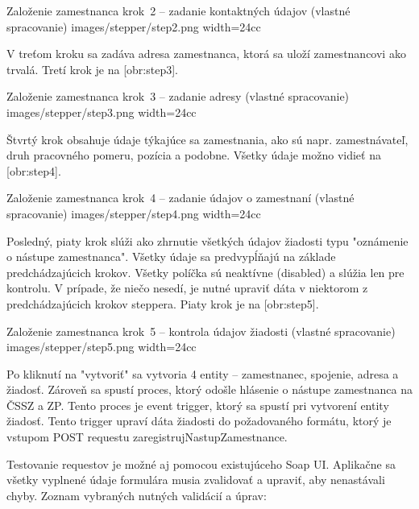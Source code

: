 {Založenie zamestnanca krok~2 -- zadanie kontaktných údajov (vlastné spracovanie)}
{images/stepper/step2.png}
{width=24cc} 

V treťom kroku sa zadáva adresa zamestnanca, ktorá sa uloží zamestnancovi ako trvalá. Tretí krok je na [obr:step3].

{Založenie zamestnanca krok~3 -- zadanie adresy (vlastné spracovanie)}
{images/stepper/step3.png}
{width=24cc} 

Štvrtý krok obsahuje údaje týkajúce sa zamestnania, ako sú napr. zamestnávateľ, druh pracovného pomeru, pozícia a podobne. Všetky údaje možno vidieť na [obr:step4].

{Založenie zamestnanca krok~4 -- zadanie údajov o zamestnaní (vlastné spracovanie)}
{images/stepper/step4.png}
{width=24cc} 

Posledný, piaty krok slúži ako zhrnutie všetkých údajov žiadosti typu "oznámenie o nástupe zamestnanca". Všetky údaje sa predvypĺňajú na základe predchádzajúcich krokov. Všetky políčka sú neaktívne (disabled) a slúžia len pre kontrolu. V prípade, že niečo nesedí, je nutné upraviť dáta v niektorom z predchádzajúcich krokov steppera. Piaty krok je na [obr:step5].


{Založenie zamestnanca krok~5 -- kontrola údajov žiadosti (vlastné spracovanie)}
{images/stepper/step5.png}
{width=24cc} 

Po kliknutí na "vytvoriť" sa vytvoria 4 entity -- zamestnanec, spojenie, adresa a žiadosť. Zároveň sa spustí proces, ktorý odošle hlásenie o nástupe zamestnanca na ČSSZ a ZP. Tento proces je event trigger, ktorý sa spustí pri vytvorení entity žiadosť. Tento trigger upraví dáta žiadosti do požadovaného formátu, ktorý je vstupom POST requestu zaregistrujNastupZamestnance.

Testovanie requestov je možné aj pomocou existujúceho Soap UI. Aplikačne sa všetky vyplnené údaje formulára musia zvalidovať a upraviť, aby nenastávali chyby. Zoznam vybraných nutných validácií a úprav:

